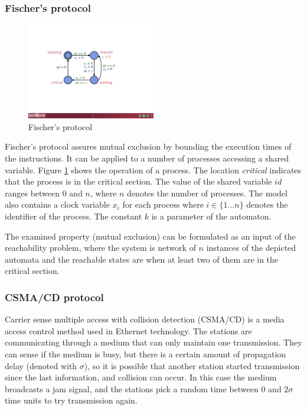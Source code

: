 \subsubsection{Fischer's protocol}

\begin{figure}
	\centering
	\includegraphics [width=0.5\textwidth]{include/figures/fischer_figure}%
	\caption{Fischer's protocol}
	\label{fig:fischer}
\end{figure}  

Fischer's protocol assures mutual exclusion by bounding the execution
times of the instructions. It can be applied to a number of processes accessing a
shared variable. Figure \ref{fig:fischer}  shows the operation of a process.
The location \emph{critical} indicates that the process is in the critical
section. The value of the shared variable $id$ ranges between 0 and $n$,
where $n$ denotes the number of processes. The model also contains a 
clock variable $x_i$ for each process where $i \in \{1 \ldots n\}$ denotes the
identifier of the process. The constant $k$ is a parameter of the automaton.

The examined property (mutual exclusion) can be formulated as an input of the reachability problem, where the system is network of $n$ instances of the depicted automata and the reachable states are when at least two of them are in the critical section. 

\subsubsection{CSMA/CD protocol}

Carrier sense multiple access with collision detection (CSMA/CD) is a media access control method used in Ethernet technology. The stations are communicating through a medium that can only maintain one transmission. They can sense if the medium is busy, but there is a certain amount of propagation delay (denoted with $\sigma$), so it is possible that another station started transmission since the last information, and collision can occur. In this case the medium broadcasts a jam signal, and the stations pick a random time between 0 and $2\sigma$ time units to try transmission again.

